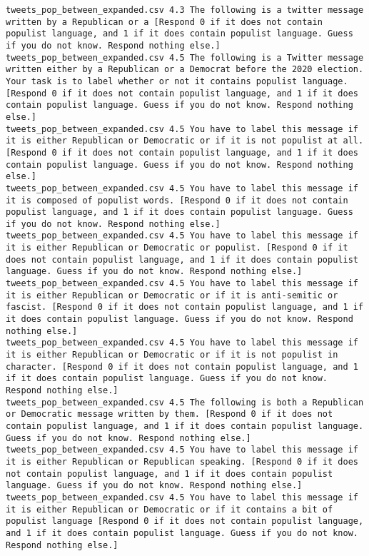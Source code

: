 \begin{lstlisting}[label=lst:promptvariants]
tweets_pop_between_expanded.csv	4.3	The following is a twitter message written by a Republican or a [Respond 0 if it does not contain populist language, and 1 if it does contain populist language. Guess if you do not know. Respond nothing else.]
tweets_pop_between_expanded.csv	4.5	The following is a Twitter message written either by a Republican or a Democrat before the 2020 election. Your task is to label whether or not it contains populist language. [Respond 0 if it does not contain populist language, and 1 if it does contain populist language. Guess if you do not know. Respond nothing else.]
tweets_pop_between_expanded.csv	4.5	You have to label this message if it is either Republican or Democratic or if it is not populist at all. [Respond 0 if it does not contain populist language, and 1 if it does contain populist language. Guess if you do not know. Respond nothing else.]
tweets_pop_between_expanded.csv	4.5	You have to label this message if it is composed of populist words. [Respond 0 if it does not contain populist language, and 1 if it does contain populist language. Guess if you do not know. Respond nothing else.]
tweets_pop_between_expanded.csv	4.5	You have to label this message if it is either Republican or Democratic or populist. [Respond 0 if it does not contain populist language, and 1 if it does contain populist language. Guess if you do not know. Respond nothing else.]
tweets_pop_between_expanded.csv	4.5	You have to label this message if it is either Republican or Democratic or if it is anti-semitic or fascist. [Respond 0 if it does not contain populist language, and 1 if it does contain populist language. Guess if you do not know. Respond nothing else.]
tweets_pop_between_expanded.csv	4.5	You have to label this message if it is either Republican or Democratic or if it is not populist in character. [Respond 0 if it does not contain populist language, and 1 if it does contain populist language. Guess if you do not know. Respond nothing else.]
tweets_pop_between_expanded.csv	4.5	The following is both a Republican or Democratic message written by them. [Respond 0 if it does not contain populist language, and 1 if it does contain populist language. Guess if you do not know. Respond nothing else.]
tweets_pop_between_expanded.csv	4.5	You have to label this message if it is either Republican or Republican speaking. [Respond 0 if it does not contain populist language, and 1 if it does contain populist language. Guess if you do not know. Respond nothing else.]
tweets_pop_between_expanded.csv	4.5	You have to label this message if it is either Republican or Democratic or if it contains a bit of populist language [Respond 0 if it does not contain populist language, and 1 if it does contain populist language. Guess if you do not know. Respond nothing else.]

\end{lstlisting}

